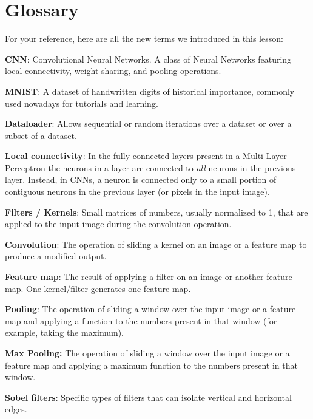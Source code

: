 \section{Glossary}

For your reference, here are all the new terms we introduced in this lesson:

\textbf{CNN}: Convolutional Neural Networks. A class of Neural Networks featuring local connectivity, weight sharing, and pooling operations. \newline

\textbf{MNIST}: A dataset of handwritten digits of historical importance, commonly used nowadays for tutorials and learning. \newline

\textbf{Dataloader}: Allows sequential or random iterations over a dataset or over a subset of a dataset. \newline

\textbf{Local connectivity}: In the fully-connected layers present in a Multi-Layer Perceptron the neurons in a layer are connected to \textit{all} neurons in the previous layer. Instead, in CNNs, a neuron is connected only to a small portion of contiguous neurons in the previous layer (or pixels in the input image). \newline

\textbf{Filters / Kernels}: Small matrices of numbers, usually normalized to 1, that are applied to the input image during the convolution operation. \newline

\textbf{Convolution}: The operation of sliding a kernel on an image or a feature map to produce a modified output. \newline

\textbf{Feature map}: The result of applying a filter on an image or another feature map. One kernel/filter generates one feature map. \newline

\textbf{Pooling}: The operation of sliding a window over the input image or a feature map and applying a function to the numbers present in that window (for example, taking the maximum). \newline

\textbf{Max Pooling:} The operation of sliding a window over the input image or a feature map and applying a maximum function to the numbers present in that window. \newline

\textbf{Sobel filters}: Specific types of filters that can isolate vertical and horizontal edges. \newline

